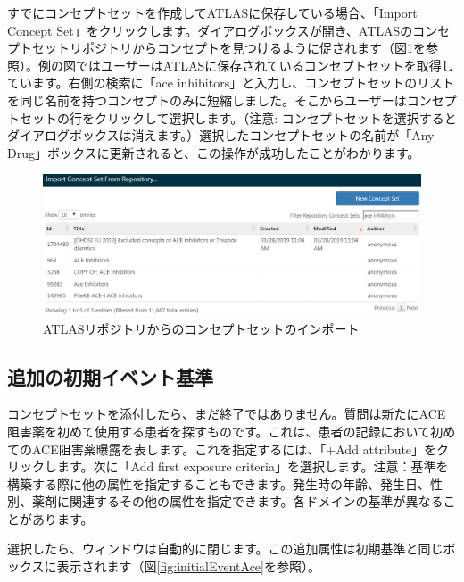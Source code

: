 \documentclass[
  11pt]{book}
\theoremstyle{definition}
\theoremstyle{definition}
\theoremstyle{definition}
\theoremstyle{definition}
\theoremstyle{remark}
\begin{document}
すでにコンセプトセットを作成してATLASに保存している場合、「Import Concept Set」をクリックします。ダイアログボックスが開き、ATLASのコンセプトセットリポジトリからコンセプトを見つけるように促されます（図\ref{fig:ATLASfindyourconcept}を参照）。例の図ではユーザーはATLASに保存されているコンセプトセットを取得しています。右側の検索に「ace inhibitors」と入力し、コンセプトセットのリストを同じ名前を持つコンセプトのみに短縮しました。そこからユーザーはコンセプトセットの行をクリックして選択します。（注意: コンセプトセットを選択するとダイアログボックスは消えます。）選択したコンセプトセットの名前が「Any Drug」ボックスに更新されると、この操作が成功したことがわかります。

\begin{figure}

{\centering \includegraphics[width=1\linewidth]{images/Cohorts/ATLAS-findingyourconcept} 

}

\caption{ATLASリポジトリからのコンセプトセットのインポート}\label{fig:ATLASfindyourconcept}
\end{figure}

\subsection{追加の初期イベント基準}\label{ux8ffdux52a0ux306eux521dux671fux30a4ux30d9ux30f3ux30c8ux57faux6e96}

コンセプトセットを添付したら、まだ終了ではありません。質問は新たにACE阻害薬を初めて使用する患者を探すものです。これは、患者の記録において初めてのACE阻害薬曝露を表します。これを指定するには、「+Add attribute」をクリックします。次に「Add first exposure criteria」を選択します。注意：基準を構築する際に他の属性を指定することもできます。発生時の年齢、発生日、性別、薬剤に関連するその他の属性を指定できます。各ドメインの基準が異なることがあります。

選択したら、ウィンドウは自動的に閉じます。この追加属性は初期基準と同じボックスに表示されます（図\ref{fig:initialEventAce}を参照）。
\end{document}
